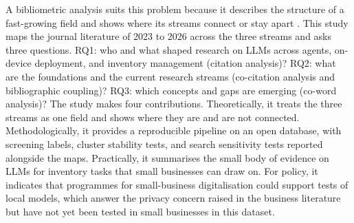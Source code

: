 A bibliometric analysis suits this problem because it describes the structure of a fast-growing field and shows where its streams connect or stay apart \parencite{donthu2021,zupic2015}. This study maps the journal literature of 2023 to 2026 across the three streams and asks three questions. RQ1: who and what shaped research on LLMs across agents, on-device deployment, and inventory management (citation analysis)? RQ2: what are the foundations and the current research streams (co-citation analysis and bibliographic coupling)? RQ3: which concepts and gaps are emerging (co-word analysis)? The study makes four contributions. Theoretically, it treats the three streams as one field and shows where they are and are not connected. Methodologically, it provides a reproducible pipeline on an open database, with screening labels, cluster stability tests, and search sensitivity tests reported alongside the maps. Practically, it summarises the small body of evidence on LLMs for inventory tasks that small businesses can draw on. For policy, it indicates that programmes for small-business digitalisation could support tests of local models, which answer the privacy concern raised in the business literature but have not yet been tested in small businesses in this dataset.
